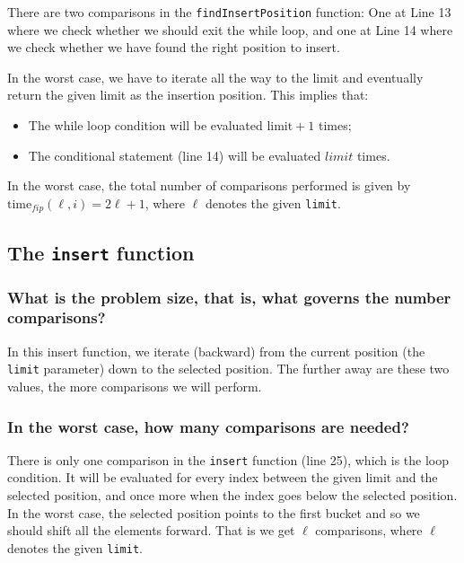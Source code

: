 \documentclass[11pt]{article}
\begin{document}
There are two comparisons in the \texttt{findInsertPosition} function:
One at Line 13 where we check whether we should exit the
while loop, and one at Line 14 where we check whether we have
found the right position to insert.

In the worst case, we have to iterate all the way to the limit
and eventually return the given limit as the insertion
position. This implies that:
\begin{itemize}
\item The while loop condition will be evaluated \(\text{limit} + 1\)
times;
\item The conditional statement (line 14) will be evaluated
\(limit\) times.
\end{itemize}

In the worst case, the total number of comparisons performed is
given by \(\text{time}_{fip}(\ell, i)=2 \ell + 1\), where \(\ell\)
denotes the given \texttt{limit}.

\subsection{The \texttt{insert} function}
\label{sec:org8801599}

\subsubsection{What is the problem size, that is, what governs the number comparisons?}
\label{sec:orgf2948f9}

In this insert function, we iterate (backward) from the current
position (the \texttt{limit} parameter) down to the
selected position. The further away are these two values, the
more comparisons we will perform.

\subsubsection{In the worst case, how many comparisons are needed?}
\label{sec:org4715d0e}

There is only one comparison in the \texttt{insert} function (line
25), which is the loop condition. It will be evaluated for
every index between the given limit and the selected position, and
once more when the index goes below the selected position. In the
worst case, the selected position points to the first bucket and
so we should shift all the elements forward. That is we get \(\ell\)
comparisons, where \(\ell\) denotes the given \texttt{limit}.
\end{document}
